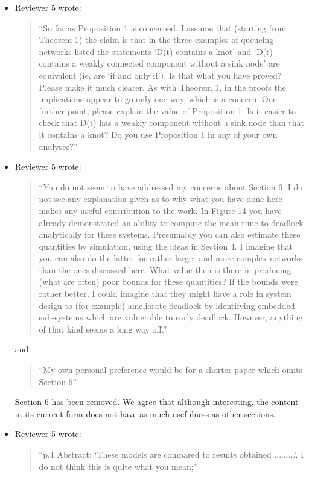 \documentclass{article}
\begin{document}
\begin{itemize}
\item Reviewer 5 wrote:
\begin{quote}
``So far as Proposition 1 is concerned, I assume that (starting from Theorem 1) the claim is that in the three examples of queueing networks listed the statements ‘D(t) contains a knot’ and ‘D(t) contains a weakly connected component without a sink node’ are equivalent (ie, are ‘if and only if’). Is that what you have proved? Please make it much clearer. As with Theorem 1, in the proofs the implications appear to go only one way, which is a concern. One further point, please explain the value of Proposition 1. Is it easier to check that D(t) has a weakly component without a sink node than that it contains a knot? Do you use Proposition 1 in any of your own analyses?''
\end{quote}

\item Reviewer 5 wrote:
\begin{quote}
``You do not seem to have addressed my concerns about Section 6. I do not see any explanation given as to why what you have done here makes any useful contribution to the work. In Figure 14 you have already demonstrated an ability to compute the mean time to deadlock analytically for these systems. Presumably you can also estimate these quantities by simulation, using the ideas in Section 4. I imagine that you can also do the latter for rather larger and more complex networks than the ones discussed here. What value then is there in producing (what are often) poor bounds for these quantities? If the bounds were rather better, I could imagine that
they might have a role in system design to (for example) ameliorate deadlock by identifying embedded sub-systems which are vulnerable to early deadlock. However, anything of that kind seems a long way off.''
\end{quote}

and

\begin{quote}
``My own personal preference would be for a shorter paper which omits Section 6''
\end{quote}

Section 6 has been removed. We agree that although interesting, the content in its current form does not have as much usefulness as other sections.


\item Reviewer 5 wrote:
\begin{quote}
``p.1 Abstract: ‘These models are compared to results obtained .........’. I do not think this is quite what you mean;''
\end{quote}


\end{itemize}
\end{document}
